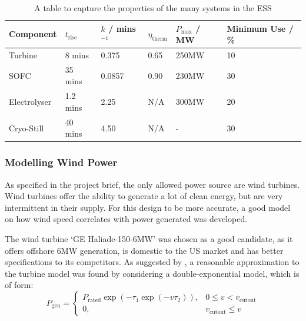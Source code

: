 %
    \begin{table}[ht]
    \label{tbl:powercomp}
            \centering
        \begin{tabular}{||l l l l l l||}
                \hline
                Component & $t_{\text{rise}}$ & $k$ / mins$^{-1}$ & $\eta_{\text{therm}}$ & $P_{\text{max}}$ / MW& Minimum Use / \%\\
                \hline
                \hline
                Turbine& 8 mins & 0.375 & 0.65 & 250MW & 10\\
                \hline
                SOFC& 35 mins & 0.0857 & 0.90 & 230MW & 30\\
                \hline
                Electrolyser& 1.2 mins & 2.25 & N/A & 300MW & 20\\
                \hline
                Cryo-Still & 40 mins & 4.50 & N/A & - & 30\\
                \hline
        \end{tabular}
        \caption{A table to capture the properties of the many systems in the ESS}
                \label{tbl:time}
    \end{table}

\subsubsection{Modelling Wind Power}

As specified in the project brief, the only allowed power source are wind turbines.
Wind turbines offer the ability to generate a lot of clean energy, but are very intermittent in their supply.
For this design to be more accurate, a good model on how wind speed correlates with power generated was developed.

The wind turbine `GE Haliade-150-6MW' was chosen as a good candidate, as it offers offshore 6MW generation, is domestic to the US market and has better specifications to its competitors.
As suggested by \cite{power:wturbine}, a reasonable approximation to the turbine model was found by considering a double-exponential model, which is of form:
%
\begin{equation}
        \label{eqn:wturbexm}
        P_{\text{gen}} =
        \begin{cases}
                P_{\text{rated}} \exp ( -\tau_1 \exp (-v \tau_2)),& 0 \leq v < v_{\text{cutout}}\\
                0,& v_{\text{cutout}} \leq v
        \end{cases}
\end{equation}

